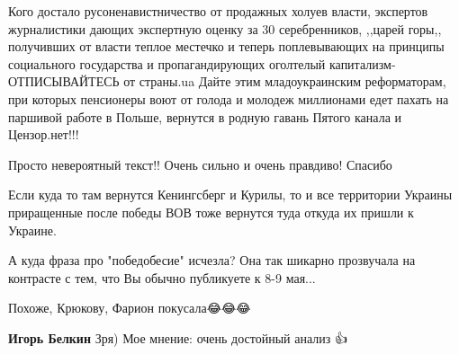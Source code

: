 \begin{itemize}
Кого достало русоненавистничество от продажных холуев власти, экспертов
журналистики дающих экспертную оценку за 30 серебренников, ,,царей горы,,
получивших от власти теплое местечко и теперь поплевывающих на принципы
социального государства и пропагандирующих оголтелый капитализм- ОТПИСЫВАЙТЕСЬ
от страны.ua Дайте этим младоукраинским реформаторам, при которых пенсионеры
воют от голода и молодеж миллионами едет пахать на паршивой работе в Польше,
вернутся в родную гавань Пятого канала и Цензор.нет!!!

 
Просто невероятный текст!! Очень сильно и очень правдиво! Спасибо

 
Если куда то там вернутся Кенингсберг и Курилы, то и все территории Украины
приращенные после победы ВОВ тоже вернутся туда откуда их пришли к Украине.

 
А куда фраза про "победобесие" исчезла? Она так шикарно прозвучала на контрасте с тем, что Вы обычно публикуете к 8-9 мая...

 
Похоже, Крюкову, Фарион покусала😂😂😂

\begin{itemize}
 
\textbf{Игорь Белкин} Зря) Мое мнение: очень достойный анализ 👍👏


\end{itemize}
\end{itemize}
